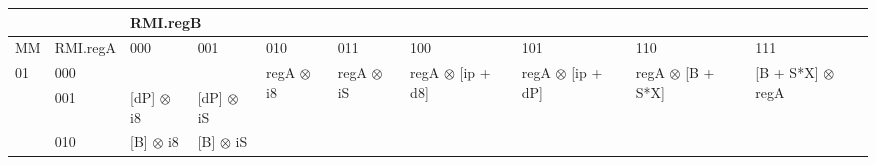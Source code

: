 \documentclass{article}
\begin{document}
\begin{adjustbox}{width=1\textwidth}
\begin{tabular}{|ll|llllllll|}
\multicolumn{2}{|l|}{}                               & \multicolumn{8}{l|}{RMI.regB}                                                                                                                                                                                                                                                                                                                                                                                                                                                                  \\ \hline
\multicolumn{1}{|l|}{MM}                  & RMI.regA & \multicolumn{1}{l|}{000}                             & \multicolumn{1}{l|}{001}                             & \multicolumn{1}{l|}{010}                                & \multicolumn{1}{l|}{011}                                & \multicolumn{1}{l|}{100}                                           & \multicolumn{1}{l|}{101}                                           & \multicolumn{1}{l|}{110}                                           & 111                                           \\ \hline
\multicolumn{1}{|l|}{\multirow{8}{*}{01}} & 000      & \multicolumn{1}{l|}{}                                & \multicolumn{1}{l|}{}                                & \multicolumn{1}{l|}{\multirow{8}{*}{regA $\otimes$ i8}} & \multicolumn{1}{l|}{\multirow{8}{*}{regA $\otimes$ iS}} & \multicolumn{1}{l|}{\multirow{8}{*}{regA $\otimes$ {[}ip + d8{]}}} & \multicolumn{1}{l|}{\multirow{8}{*}{regA $\otimes$ {[}ip + dP{]}}} & \multicolumn{1}{l|}{\multirow{8}{*}{regA $\otimes$ {[}B + S*X{]}}} & \multirow{8}{*}{{[}B + S*X{]} $\otimes$ regA} \\ \cline{2-4}
\multicolumn{1}{|l|}{}                    & 001      & \multicolumn{1}{l|}{{[}dP{]} $\otimes$ i8}           & \multicolumn{1}{l|}{{[}dP{]} $\otimes$ iS}           & \multicolumn{1}{l|}{}                                   & \multicolumn{1}{l|}{}                                   & \multicolumn{1}{l|}{}                                              & \multicolumn{1}{l|}{}                                              & \multicolumn{1}{l|}{}                                              &                                               \\ \cline{2-4}
\multicolumn{1}{|l|}{}                    & 010      & \multicolumn{1}{l|}{{[}B{]} $\otimes$ i8}            & \multicolumn{1}{l|}{{[}B{]} $\otimes$ iS}            & \multicolumn{1}{l|}{}                                   & \multicolumn{1}{l|}{}                                   & \multicolumn{1}{l|}{}                                              & \multicolumn{1}{l|}{}                                              & \multicolumn{1}{l|}{}                                              &                                               \\ \cline{2-4}

\end{tabular}
\end{adjustbox}
\end{document}
